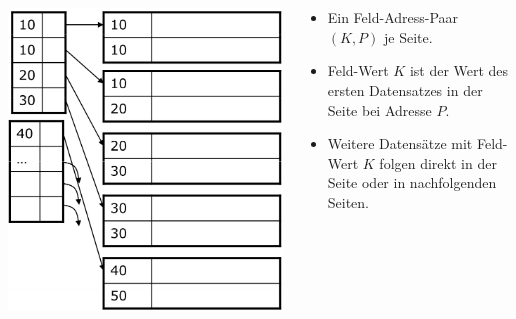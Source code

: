 \begin{frame}{\insertsection}
\framesubtitle{\insertsubsection}
\\[4pt]
\begin{columns}[T]
\begin{column}{.33\textwidth}
\includegraphics[scale=0.23]{img/Index_NonKey_Primary-Simple-2.png}
\end{column}
\begin{column}{.67\textwidth}
\begin{itemize}
\item Ein Feld-Adress-Paar $(K,P)$ je Seite. 
\item Feld-Wert $K$ ist der Wert des ersten Datensatzes in der Seite bei Adresse $P$.  
\item Weitere Datens\"atze mit Feld-Wert $K$ folgen direkt in der Seite oder in nachfolgenden Seiten.
\end{itemize}
\end{column}
\end{columns}
\end{frame}

